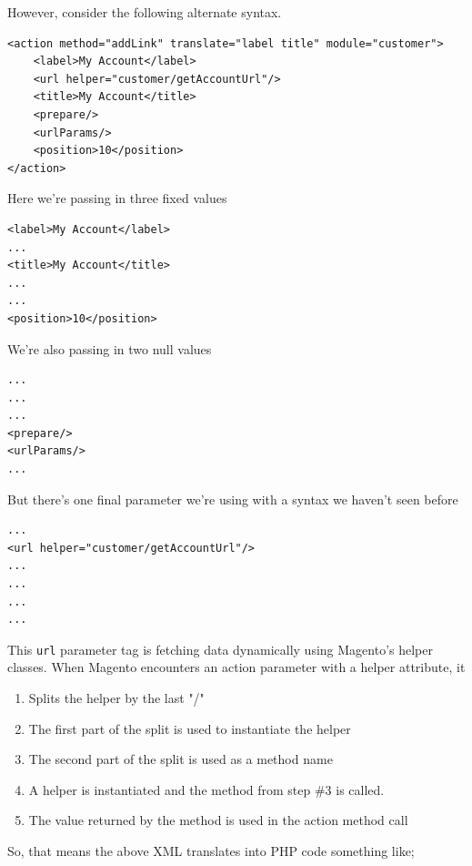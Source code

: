 \documentclass[oneside]{book}
\begin{document}
However, consider the following alternate syntax.

\begin{lstlisting}
<action method="addLink" translate="label title" module="customer">
    <label>My Account</label>
    <url helper="customer/getAccountUrl"/>
    <title>My Account</title>
    <prepare/>
    <urlParams/>
    <position>10</position>
</action>

\end{lstlisting}


Here we're passing in three fixed values

\begin{lstlisting}
<label>My Account</label>
...
<title>My Account</title>   
...
...
<position>10</position>

\end{lstlisting}


We're also passing in two null values

\begin{lstlisting}
...
...
...
<prepare/>
<urlParams/>
...

\end{lstlisting}


But there's one final parameter we're using with a syntax we haven't seen before

\begin{lstlisting}
...
<url helper="customer/getAccountUrl"/>
...
...
...
...

\end{lstlisting}


This \footnotesize\texttt{url} \normalsize  parameter tag is fetching data dynamically using Magento's helper classes.  When Magento encounters an action parameter with a helper attribute, it

\begin{enumerate}
\item Splits the helper by the last "/"
\item The first part of the split is used to instantiate the helper
\item The second part of the split is used as a method name
\item A helper is instantiated and the method from step \#3 is called. 
\item The value returned by the method is used in the action method call
\end{enumerate}


So, that means the above XML translates into PHP code something like;
\end{document}
